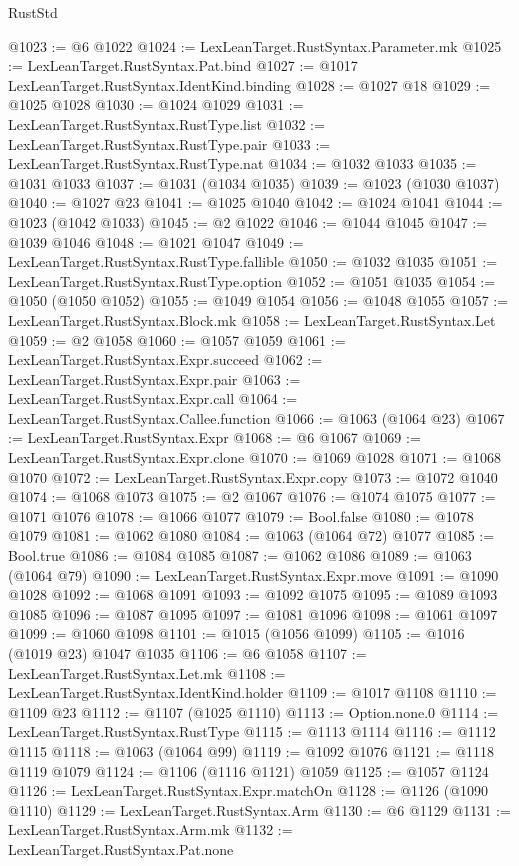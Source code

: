 \begin{lexlean}{RustStd}
\begin{coremodule}
{\begin{coremodule}
{{{{{{{{{{{{{{{{{{{{{{{{{{{{{{{{{{{@1023 := @6 @1022
@1024 := LexLeanTarget.RustSyntax.Parameter.mk
@1025 := LexLeanTarget.RustSyntax.Pat.bind
@1027 := @1017 LexLeanTarget.RustSyntax.IdentKind.binding
@1028 := @1027 @18
@1029 := @1025 @1028
@1030 := @1024 @1029
@1031 := LexLeanTarget.RustSyntax.RustType.list
@1032 := LexLeanTarget.RustSyntax.RustType.pair
@1033 := LexLeanTarget.RustSyntax.RustType.nat
@1034 := @1032 @1033
@1035 := @1031 @1033
@1037 := @1031 (@1034 @1035)
@1039 := @1023 (@1030 @1037)
@1040 := @1027 @23
@1041 := @1025 @1040
@1042 := @1024 @1041
@1044 := @1023 (@1042 @1033)
@1045 := @2 @1022
@1046 := @1044 @1045
@1047 := @1039 @1046
@1048 := @1021 @1047
@1049 := LexLeanTarget.RustSyntax.RustType.fallible
@1050 := @1032 @1035
@1051 := LexLeanTarget.RustSyntax.RustType.option
@1052 := @1051 @1035
@1054 := @1050 (@1050 @1052)
@1055 := @1049 @1054
@1056 := @1048 @1055
@1057 := LexLeanTarget.RustSyntax.Block.mk
@1058 := LexLeanTarget.RustSyntax.Let
@1059 := @2 @1058
@1060 := @1057 @1059
@1061 := LexLeanTarget.RustSyntax.Expr.succeed
@1062 := LexLeanTarget.RustSyntax.Expr.pair
@1063 := LexLeanTarget.RustSyntax.Expr.call
@1064 := LexLeanTarget.RustSyntax.Callee.function
@1066 := @1063 (@1064 @23)
@1067 := LexLeanTarget.RustSyntax.Expr
@1068 := @6 @1067
@1069 := LexLeanTarget.RustSyntax.Expr.clone
@1070 := @1069 @1028
@1071 := @1068 @1070
@1072 := LexLeanTarget.RustSyntax.Expr.copy
@1073 := @1072 @1040
@1074 := @1068 @1073
@1075 := @2 @1067
@1076 := @1074 @1075
@1077 := @1071 @1076
@1078 := @1066 @1077
@1079 := Bool.false
@1080 := @1078 @1079
@1081 := @1062 @1080
@1084 := @1063 (@1064 @72) @1077
@1085 := Bool.true
@1086 := @1084 @1085
@1087 := @1062 @1086
@1089 := @1063 (@1064 @79)
@1090 := LexLeanTarget.RustSyntax.Expr.move
@1091 := @1090 @1028
@1092 := @1068 @1091
@1093 := @1092 @1075
@1095 := @1089 @1093 @1085
@1096 := @1087 @1095
@1097 := @1081 @1096
@1098 := @1061 @1097
@1099 := @1060 @1098
@1101 := @1015 (@1056 @1099)
@1105 := @1016 (@1019 @23) @1047 @1035
@1106 := @6 @1058
@1107 := LexLeanTarget.RustSyntax.Let.mk
@1108 := LexLeanTarget.RustSyntax.IdentKind.holder
@1109 := @1017 @1108
@1110 := @1109 @23
@1112 := @1107 (@1025 @1110)
@1113 := Option.none.{0}
@1114 := LexLeanTarget.RustSyntax.RustType
@1115 := @1113 @1114
@1116 := @1112 @1115
@1118 := @1063 (@1064 @99)
@1119 := @1092 @1076
@1121 := @1118 @1119 @1079
@1124 := @1106 (@1116 @1121) @1059
@1125 := @1057 @1124
@1126 := LexLeanTarget.RustSyntax.Expr.matchOn
@1128 := @1126 (@1090 @1110)
@1129 := LexLeanTarget.RustSyntax.Arm
@1130 := @6 @1129
@1131 := LexLeanTarget.RustSyntax.Arm.mk
@1132 := LexLeanTarget.RustSyntax.Pat.none
}}}}}}}}}}}}}}}}}}}}}}}}}}}}}}}}}}}
\end{coremodule}}
\end{coremodule}
\end{lexlean}
